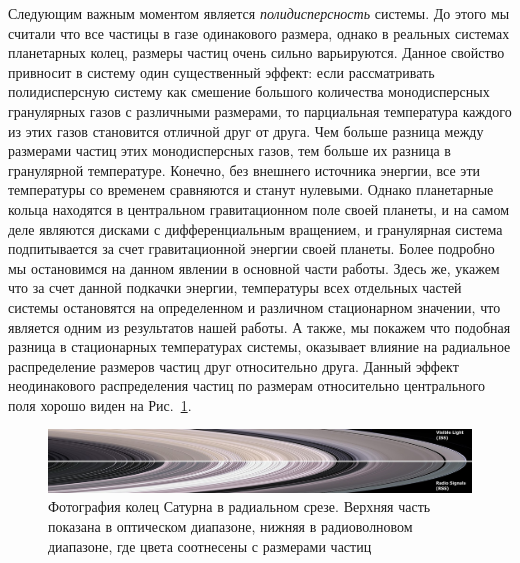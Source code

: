 Следующим важным моментом является \emph{полидисперсность} системы. До этого мы считали что все частицы в газе одинакового размера, однако в реальных
системах планетарных колец, размеры частиц очень сильно варьируются. Данное свойство привносит в систему один существенный эффект: если рассматривать
полидисперсную систему как смешение большого количества монодисперсных гранулярных газов с различными размерами, то парциальная температура каждого
из этих газов становится отличной друг от друга. Чем больше разница между размерами частиц этих монодисперсных газов, тем больше их разница в
гранулярной температуре. Конечно, без внешнего источника энергии, все эти температуры со временем сравняются и станут нулевыми. Однако планетарные
кольца находятся в центральном гравитационном поле своей планеты, и на самом деле являются дисками с дифференциальным вращением, и гранулярная система
подпитывается за счет гравитационной энергии своей планеты. Более подробно мы остановимся на данном явлении в основной части работы. Здесь же,
укажем что за счет данной подкачки энергии, температуры всех отдельных частей системы остановятся на определенном и различном стационарном значении, 
что является одним из результатов нашей работы. А также, мы покажем что подобная разница в стационарных температурах системы, оказывает влияние
на радиальное распределение размеров частиц друг относительно друга. Данный эффект неодинакового распределения частиц по размерам относительно
центрального поля хорошо виден на Рис.~\ref{fig:cassini_rings_radial_sizes}.

\begin{figure}[ht]
    \centering
    \includegraphics[width=\textwidth]{figures/1800px-Saturn's_rings_in_visible_light_and_radio.jpg}
    \caption{Фотография колец Сатурна в радиальном срезе. Верхняя часть показана в оптическом диапазоне, нижняя в радиоволновом диапазоне, 
    где цвета соотнесены с размерами частиц}
    \label{fig:cassini_rings_radial_sizes}
\end{figure}